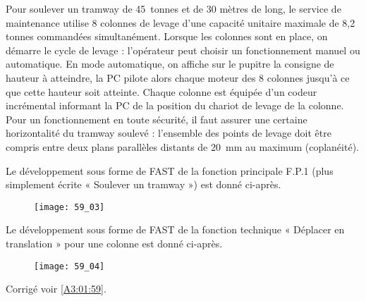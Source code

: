 Pour soulever un tramway de \SI{45}{tonnes} et de 30 mètres de long, le service de maintenance utilise 8
colonnes de levage d'une capacité unitaire maximale de 8,2 tonnes commandées simultanément. Lorsque les colonnes sont en place, on démarre le cycle de levage :
l’opérateur peut choisir un fonctionnement manuel ou automatique. En mode automatique, on
affiche sur le pupitre la consigne de hauteur à atteindre, la PC pilote alors chaque moteur des 8
colonnes jusqu’à ce que cette hauteur soit atteinte. Chaque colonne est équipée d’un codeur
incrémental informant la PC de la position du chariot de levage de la colonne. Pour un
fonctionnement en toute sécurité, il faut assurer une certaine horizontalité du tramway soulevé :
l'ensemble des points de levage doit être compris entre deux plans parallèles distants de \SI{20}{mm} au
maximum (coplanéité).



\begin{multicols}{2}

Le développement sous forme de FAST de la fonction principale F.P.1 (plus simplement écrite
« Soulever un tramway ») est donné ci-après.


\begin{figure}[H]
\centering
\texttt{[image: 59\_03]}
\end{figure}

Le développement sous forme de FAST de la fonction technique « Déplacer en translation » pour
une colonne est donné ci-après.

\begin{figure}[H]
\centering
\texttt{[image: 59\_04]}
\end{figure}
\end{multicols}




\ifprof
\else
\begin{flushright}
\footnotesize{Corrigé  voir \ref{A3:01:59}.}
\end{flushright}%
\fi